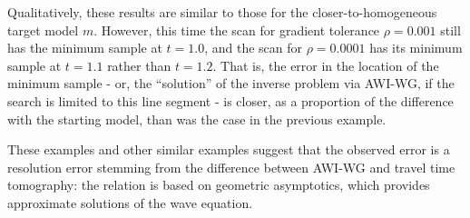 Qualitatively, these results are similar to those for the closer-to-homogeneous target model $m$. However, this time the scan for gradient tolerance $\rho=0.001$ still has the minimum sample at $t=1.0$, and the scan for $\rho=0.0001$ has its minimum sample at $t=1.1$ rather than $t=1.2$. That is, the error in the location of the minimum sample - or, the ``solution'' of the inverse problem via AWI-WG, if the search is limited to this line segment - is closer, as a proportion of the difference with the starting model, than was the case in the previous example.

These examples and other similar examples suggest that the observed error is a resolution error stemming from the difference between AWI-WG and travel time tomography: the relation is based on geometric asymptotics, which provides approximate solutions of the wave equation.

